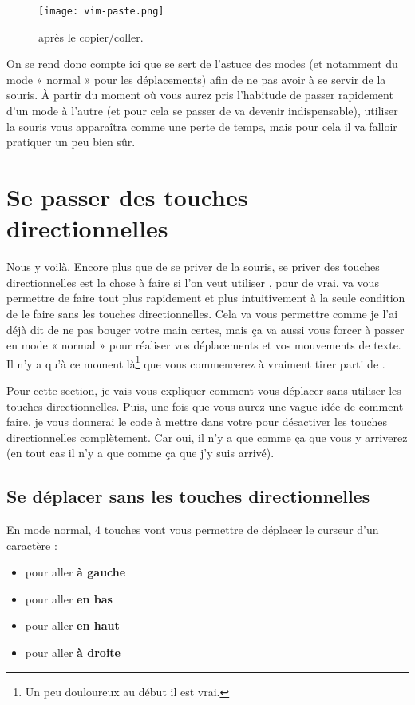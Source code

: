 \begin{figure}%
  \texttt{[image: vim-paste.png]}
  \caption{\vim après le copier/coller.}
  \label{fig:vim-paste}
\end{figure}

On se rend donc compte ici que \vim se sert de l'astuce des modes (et notamment du mode « normal » pour les déplacements) afin de ne pas avoir à se servir de la souris.
À partir du moment où vous aurez pris l'habitude de passer rapidement d'un mode à l'autre (et pour cela se passer de \ttesc va devenir indispensable), utiliser la souris vous apparaîtra comme une perte de temps, mais pour cela il va falloir pratiquer un peu bien sûr.


\section{Se passer des touches directionnelles}\label{sec:se-passer-touches-dir}

Nous y voilà. Encore plus que de se priver de la souris, se priver des touches directionnelles est la chose à faire si l'on veut utiliser \vim, pour de vrai. \vim va vous permettre de faire tout plus rapidement et plus intuitivement à la seule condition de le faire sans les touches directionnelles.
Cela va vous permettre comme je l'ai déjà dit de ne pas bouger votre main certes, mais ça va aussi vous forcer à passer en mode « normal » pour réaliser vos déplacements et vos mouvements de texte. Il n'y a qu'à ce moment là\footnote{Un peu douloureux au début il est vrai.} que vous commencerez à vraiment tirer parti de \vim.

Pour cette section, je vais vous expliquer comment vous déplacer sans utiliser les touches directionnelles. Puis, une fois que vous aurez une vague idée de comment faire, je vous donnerai le code à mettre dans votre \vimrc pour désactiver les touches directionnelles complètement. Car oui, il n'y a que comme ça que vous y arriverez (en tout cas il n'y a que comme ça que j'y suis arrivé).


\subsection{Se déplacer sans les touches directionnelles}

En mode normal, 4 touches vont vous permettre de déplacer le curseur d'un caractère :
\begin{itemize}
    \item \tth pour aller \textbf{à gauche}
    \item \ttj pour aller \textbf{en bas}
    \item \ttk pour aller \textbf{en haut}
    \item \ttl pour aller \textbf{à droite}
\end{itemize}

